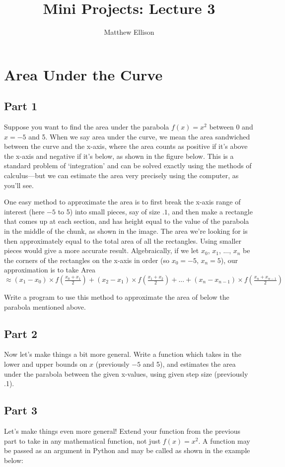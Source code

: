 \documentclass{hitec}
\title{Mini Projects: Lecture 3}
\author{Matthew Ellison}
\begin{document}
\maketitle



\section{Area Under the Curve}
\subsection{Part 1}
Suppose you want to find the area under the parabola $f(x)=x^2$ between 0 and $x=-5$ and 5. When we say area under the curve, we mean the area sandwiched between the curve and the x-axis, where the area counts as positive if it's above the x-axis and negative if it's below, as shown in the figure below. This is a standard problem of `integration' and can be solved exactly using the methods of calculus---but we can estimate the area very precisely using the computer, as you'll see.

One easy method to approximate the area is to first break the x-axis range of interest (here $-5$ to 5) into small pieces, say of size $.1$, and then make a rectangle that comes up at each section, and has height equal to the value of the parabola in the middle of the chunk, as shown in the image. The area we're looking for is then approximately equal to the total area of all the rectangles. Using smaller pieces would give a more accurate result.
Algebraically, if we let $x_0$, $x_1$, ..., $x_n$ be the corners of the rectangles on the x-axis in order (so $x_0=-5$, $x_n=5$), our approximation is to take Area $\approx(x_1-x_0)\times f\left(\frac{x_0+x_1}{2}\right)+(x_2-x_1)\times f\left(\frac{x_1+x_2}{2}\right)+...+(x_n-x_{n-1})\times f\left(\frac{x_n+x_{n-1}}{2}\right)$

Write a program to use this method to approximate the area of below the parabola mentioned above.

\subsection{Part 2}
Now let's make things a bit more general. Write a function which takes in the lower and upper bounds on $x$ (previously $-5$ and 5), and estimates the area under the parabola between the given x-values, using given step size (previously .1).

\subsection{Part 3}
Let's make things even more general! Extend your function from the previous part to take in any mathematical function, not just $f(x)=x^2$. A function may be passed as an argument in Python and may be called as shown in the example below:
\end{document}
